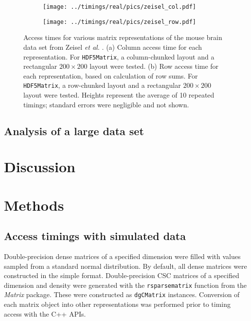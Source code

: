 \documentclass[10pt,letterpaper]{article}
\newcommand{\code}[1]{\texttt{#1}}
\begin{document}
\begin{figure}[bt]
    \begin{subfigure}[b]{0.49\textwidth}
        \texttt{[image: ../timings/real/pics/zeisel\_col.pdf]}
        \caption{}
    \end{subfigure}
    \begin{subfigure}[b]{0.49\textwidth}
        \texttt{[image: ../timings/real/pics/zeisel\_row.pdf]}
        \caption{}
    \end{subfigure}
    \caption{Access times for various matrix representations of the mouse brain data set from Zeisel \textit{et al.} \cite{zeisel2015brain}.
        (a) Column access time for each representation.
        For \code{HDF5Matrix}, a column-chunked layout and a rectangular $200 \times 200$ layout were tested.
        (b) Row access time for each representation, based on calculation of row sums.
        For \code{HDF5Matrix}, a row-chunked layout and a rectangular $200 \times 200$ layout were tested.
        Heights represent the average of 10 repeated timings; standard errors were negligible and not shown.
    }
    \label{fig:zeisel}
\end{figure}

\subsection*{Analysis of a large data set}

\section*{Discussion}

\section*{Methods}

\subsection*{Access timings with simulated data}
Double-precision dense matrices of a specified dimension were filled with values sampled from a standard normal distribution.
By default, all dense matrices were constructed in the simple format.
Double-precision CSC matrices of a specified dimension and density were generated with the \code{rsparsematrix} function from the \textit{Matrix} package. 
These were constructed as \code{dgCMatrix} instances.
Conversion of each matrix object into other representations was performed prior to timing access with the C++ APIs.
\end{document}
